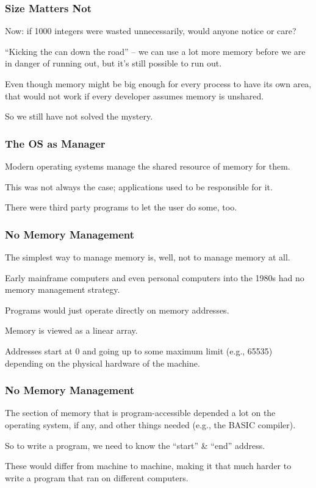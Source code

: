 \begin{frame}
\frametitle{Size Matters Not}

Now: if 1000 integers were wasted unnecessarily, would anyone notice or care?

``Kicking the can down the road'' -- we can use a lot more memory before we are in danger of running out, but it's still possible to run out. 

Even though memory might be big enough for every process to have its own area, that would not work if every developer assumes memory is unshared. 

So we still have not solved the mystery.

\end{frame}

\begin{frame}
\frametitle{The OS as Manager}

Modern operating systems manage the shared resource of memory for them. 

This was not always the case; applications used to be responsible for it.

There were third party programs to let the user do some, too. 


\end{frame}

\begin{frame}
\frametitle{No Memory Management}

The simplest way to manage memory is, well, not to manage memory at all.

Early mainframe computers and even personal computers into the 1980s had no memory management strategy. 

Programs would just operate directly on memory addresses. 

Memory is viewed as a linear array. 

Addresses start at 0 and going up to some maximum limit (e.g., 65535) depending on the physical hardware of the machine. 


\end{frame}

\begin{frame}
\frametitle{No Memory Management}

The section of memory that is program-accessible depended a lot on the operating system, if any, and other things needed (e.g., the BASIC compiler). 

So to write a program, we need to know the ``start'' \& ``end'' address. 


These would differ from machine to machine, making it that much harder to write a program that ran on different computers.



\end{frame}

